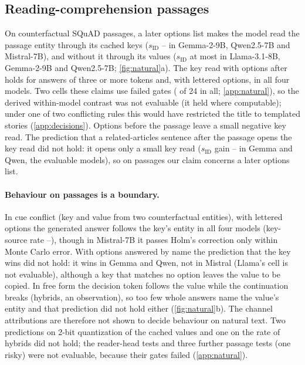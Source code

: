 \subsection{Reading-comprehension passages}\label{sec:natural}

On counterfactual SQuAD passages, a later options list makes the model read the passage entity through its cached keys ($s_{\mathrm{ID}}$ \JaSidOptaMistralSeven--\JaSidOptaQwenSeven{} in Gemma-2-9B, Qwen2.5-7B and Mistral-7B), and without it through its values ($s_{\mathrm{ID}}$ at most \JaSidNomLlamaEight{} in Llama-3.1-8B, Gemma-2-9B and Qwen2.5-7B; \cref{fig:natural}a). The key read with options after holds for answers of three or more tokens\rsk{} and, with lettered options, in all four models. Two cells these claims use failed gates (\JaGateFailCells{} of 24 in all; \cref{app:natural}), so the derived within-model contrast was not evaluable (it held where computable); under one of two conflicting rules this would have restricted the title to templated stories (\cref{app:decisions}). Options before the passage leave a small negative key read. The prediction that a related-articles sentence after the passage opens the key read did not hold\rsk: it opens only a small key read ($s_{\mathrm{ID}}$ gain \JaFiveDiffQwenSeven--\JaFiveDiffGemmaNine{} in Gemma and Qwen, the evaluable models), so on passages our claim concerns a later options list.

\paragraph{Behaviour on passages is a boundary.}
In cue conflict (key and value from two counterfactual entities), with lettered options the generated answer follows the key's entity in all four models (key-source rate \JaKeySrcLetaMistralSeven--\JaKeySrcLetaGemmaNine)\rsk, though in Mistral-7B it passes Holm's correction only within Monte Carlo error. With options answered by name the prediction that the key wins did not hold\rsk: it wins in Gemma and Qwen, not in Mistral (Llama's cell is not evaluable), although a key that matches no option leaves the value to be copied\rsk. In free form the decision token follows the value while the continuation breaks (hybrids, an observation), so too few whole answers name the value's entity and that prediction did not hold\rsk{} either (\cref{fig:natural}b). The channel attributions are therefore not shown to decide behaviour on natural text. Two predictions on 2-bit quantization of the cached values and one on the rate of hybrids did not hold\rsk; the reader-head tests\rsk{} and three further passage tests (one risky) were not evaluable, because their gates failed (\cref{app:natural}).

